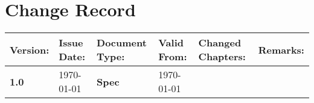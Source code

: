 \section*{Change Record}

\bgroup
\def\arraystretch{1.3}
\begin{tabular}{|p{15mm}|p{20mm}|p{20mm}|p{20mm}|p{30mm}|p{30mm}|}
\hline
Version:    &   Issue Date: &   Document Type:  &   Valid From: & Changed Chapters: & Remarks: \\
\hline
\textbf{1.0}         &   \today      &   \textbf{Spec}          &   \today   &   &   \\
\hline
\end{tabular}
\egroup
